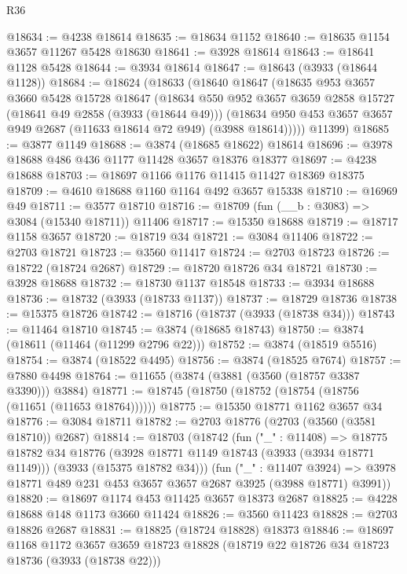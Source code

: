 \begin{lexlean}{R36}
\begin{coremodule}
@18634 := @4238 @18614
@18635 := @18634 @1152
@18640 := @18635 @1154 @3657 @11267 @5428 @18630
@18641 := @3928 @18614
@18643 := @18641 @1128 @5428
@18644 := @3934 @18614
@18647 := @18643 (@3933 (@18644 @1128))
@18684 := @18624
    (@18633
      (@18640
        @18647
        (@18635
          @953
          @3657
          @3660
          @5428
          @15728
          @18647
          (@18634
            @550
            @952
            @3657
            @3659
            @2858
            @15727
            (@18641 @49 @2858 (@3933 (@18644 @49)))
            (@18634 @950 @453 @3657 @3657 @949 @2687 (@11633 @18614 @72 @949) (@3988 @18614)))))
      @11399)
@18685 := @3877 @1149
@18688 := @3874 (@18685 @18622) @18614
@18696 := @3978 @18688 @486 @436 @1177 @11428 @3657 @18376 @18377
@18697 := @4238 @18688
@18703 := @18697 @1166 @1176 @11415 @11427 @18369 @18375
@18709 := @4610 @18688 @1160 @1164 @492 @3657 @15338
@18710 := @16969 @49
@18711 := @3577 @18710
@18716 := @18709 (fun (__b : @3083) => @3084 (@15340 @18711)) @11406
@18717 := @15350 @18688
@18719 := @18717 @1158 @3657
@18720 := @18719 @34
@18721 := @3084 @11406
@18722 := @2703 @18721
@18723 := @3560 @11417
@18724 := @2703 @18723
@18726 := @18722 (@18724 @2687)
@18729 := @18720 @18726 @34 @18721
@18730 := @3928 @18688
@18732 := @18730 @1137 @18548
@18733 := @3934 @18688
@18736 := @18732 (@3933 (@18733 @1137))
@18737 := @18729 @18736
@18738 := @15375 @18726
@18742 := @18716 (@18737 (@3933 (@18738 @34)))
@18743 := @11464 @18710
@18745 := @3874 (@18685 @18743)
@18750 := @3874 (@18611 (@11464 (@11299 @2796 @22)))
@18752 := @3874 (@18519 @5516)
@18754 := @3874 (@18522 @4495)
@18756 := @3874 (@18525 @7674)
@18757 := @7880 @4498
@18764 := @11655 (@3874 (@3881 (@3560 (@18757 @3387 @3390))) @3884)
@18771 := @18745 (@18750 (@18752 (@18754 (@18756 (@11651 (@11653 @18764))))))
@18775 := @15350 @18771 @1162 @3657 @34
@18776 := @3084 @18711
@18782 := @2703 @18776 (@2703 (@3560 (@3581 @18710)) @2687)
@18814 := @18703
    (@18742
      (fun ("_" : @11408) =>
      @18775
        @18782
        @34
        @18776
        (@3928 @18771 @1149 @18743 (@3933 (@3934 @18771 @1149)))
        (@3933 (@15375 @18782 @34)))
      (fun ("_" : @11407 @3924) =>
      @3978 @18771 @489 @231 @453 @3657 @3657 @2687 @3925 (@3988 @18771) @3991))
@18820 := @18697 @1174 @453 @11425 @3657 @18373 @2687
@18825 := @4228 @18688 @148 @1173 @3660 @11424
@18826 := @3560 @11423
@18828 := @2703 @18826 @2687
@18831 := @18825 (@18724 @18828) @18373
@18846 := @18697
    @1168
    @1172
    @3657
    @3659
    @18723
    @18828
    (@18719 @22 @18726 @34 @18723 @18736 (@3933 (@18738 @22)))

\end{coremodule}
\end{lexlean}
